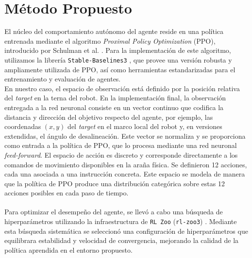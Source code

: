 \documentclass[conference]{IEEEtran}
\begin{document}
\section{Método Propuesto}
El núcleo del comportamiento autónomo del agente reside en una política entrenada mediante el algoritmo \textit{Proximal Policy Optimization} (PPO), introducido por Schulman et al. \cite{ppo}. Para la implementación de este algoritmo, utilizamos la librería \texttt{Stable-Baselines3} \cite{stable-baselines3}, que provee una versión robusta y ampliamente utilizada de PPO, así como herramientas estandarizadas para el entrenamiento y evaluación de agentes.\\
En nuestro caso, el espacio de observación está definido por la posición relativa del \textit{target} en la terna del robot. En la implementación final, la observación entregada a la red neuronal consiste en un vector continuo que codifica la distancia y dirección del objetivo respecto del agente, por ejemplo, las coordenadas $(x, y)$ del \textit{target} en el marco local del robot y, en versiones extendidas, el ángulo de desalineación. Este vector se normaliza y se proporciona como entrada a la política de PPO, que lo procesa mediante una red neuronal \textit{feed-forward}. \newline
El espacio de acción es discreto y corresponde directamente a los comandos de movimiento disponibles en la araña física. Se definieron 12 acciones, cada una asociada a una instrucción concreta. Este espacio se modela de manera que la política de PPO produce una distribución categórica sobre estas 12 acciones posibles en cada paso de tiempo. \\\\
Para optimizar el desempeño del agente, se llevó a cabo una búsqueda de hiperparámetros utilizando la infraestructura de \texttt{RL Zoo} (\texttt{rl-zoo3}) \cite{rl-zoo3}. Mediante esta búsqueda sistemática se seleccionó una configuración de hiperparámetros que equilibrara estabilidad y velocidad de convergencia, mejorando la calidad de la política aprendida en el entorno propuesto.
\end{document}
